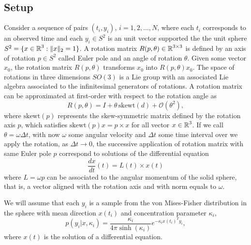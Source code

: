 \subsection{Setup}

Consider a sequence of pairs $(t_i, y_i)$, $i=1, 2, \ldots, N$, where each $t_i$ corresponds to an observed time and each $y_i \in S^2$ is an unit vector supported the the unit sphere $S^2 = \{ x \in \operatorname{\mathbb{R}}^3 : \| x \|_2 = 1 \}$. 
A rotation matrix $R(p, \theta) \in \operatorname{\mathbb{R}}^{3 \times 3}$ is defined by an axis of rotation $p \in S^2$ called Euler pole and an angle of rotation $\theta$.
Given some vector $x_0$, the rotation matrix $R(p, \theta)$ transforms $x_0$ into $R(p, \theta) x_0$.
The space of rotations in three dimensions $SO(3)$ is a Lie group with an associated Lie algebra associated to the infinitesimal generators of rotations. 
A rotation matrix can be approximated at first-order with respect to the rotation angle as
\begin{equation}
    R(p, \theta) 
    = 
    I + \theta \, \text{skewt}(d) + \mathcal O (\theta^2 ),
\end{equation}
where $ \text{skewt}(p)$ represents the skew-symmetric matrix defined by the rotation axis $p$, which satisfies $\text{skewt}(p)  x =p \times x$ for all vector $x \in \operatorname{\mathbb{R}}^3$. 
If we call $\theta = \omega \Delta t$, with now $\omega$ some angular velocity and $\Delta t$ some time interval over we apply the rotation, as $\Delta t \rightarrow 0$, the successive application of rotation matrix with same Euler pole $p$ correspond to solutions of the differential equation 
\begin{equation}
    \frac{dx}{dt} (t)
    = 
    L(t) \times x(t) %
    \label{eq:sphere-ode}
\end{equation}
where $L = \omega p$ can be associated to the angular momentum of the solid sphere, that is, a vector aligned with the rotation axis and with norm equals to $\omega$. 

We will assume that each $y_i$ is a sample from the von Mises-Fisher distribution \cite{fisher1953dispersion, Watson_1982} in the sphere with mean direction $x(t_i)$ and concentration parameter $\kappa_i$, 
\begin{equation}
    p(y_i | x, \kappa_i)
    = 
    \frac{\kappa_i}{4 \pi \sinh (\kappa_i)} e^{- \kappa_i x(t_i)^T y_i},
\end{equation}
where $x(t)$ is the solution of a differential equation. 



